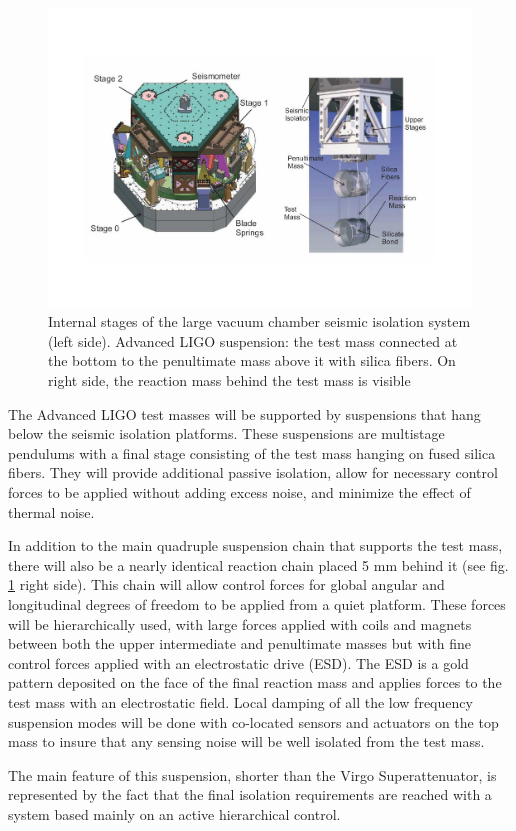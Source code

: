 \begin{figure}[htbp!]
\centering
\includegraphics[width=14cm]{./Sec_Suspensions/Figures/Active_filter_2.pdf}
\caption{Internal stages of the large vacuum chamber seismic isolation system (left side).
Advanced LIGO suspension: the test mass connected at the bottom to the penultimate mass above
it with silica fibers. On right side, the reaction mass behind the test mass is visible}
\label{fig:active_filter}
\end{figure}

The Advanced LIGO test masses will be supported by suspensions that hang below the seismic
isolation platforms. These suspensions are multistage pendulums with a final stage consisting
of the test mass hanging on fused silica fibers. They will provide additional passive isolation,
allow for necessary control forces to be applied without adding excess noise, and minimize the
effect of thermal noise.

In addition to the main quadruple suspension chain that supports the test mass, there will also
be a nearly identical reaction chain placed 5 mm behind it (see fig. \ref{fig:active_filter} 
right side). This chain will allow control forces for global angular and longitudinal degrees 
of freedom to be applied from a quiet platform. These forces will be hierarchically used, 
with large forces applied with coils and magnets between both the upper intermediate and 
penultimate masses but with fine control forces applied with an electrostatic drive (ESD). 
The ESD is a gold pattern deposited on the face of the final reaction mass and applies 
forces to the test mass with an electrostatic field.
Local damping of all the low frequency suspension modes will be done with co-located sensors
and actuators on the top mass to insure that any sensing noise will be well isolated from the
test mass.

\noindent
The main feature of this suspension, shorter than the Virgo Superattenuator, is represented by 
the fact that the final isolation requirements are reached with a system based mainly on an 
active hierarchical control.


%

